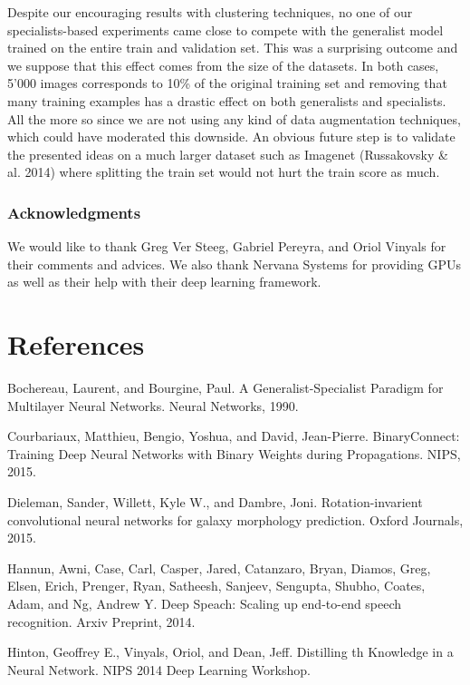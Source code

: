 \documentclass[12pt]{article}
\begin{document}
Despite our encouraging results with clustering techniques, no one of
our specialists-based experiments came close to compete with the
generalist model trained on the entire train and validation set. This
was a surprising outcome and we suppose that this effect comes from the
size of the datasets. In both cases, 5'000 images corresponds to 10\% of
the original training set and removing that many training examples has a
drastic effect on both generalists and specialists. All the more so
since we are not using any kind of data augmentation techniques, which
could have moderated this downside. An obvious future step is to
validate the presented ideas on a much larger dataset such as Imagenet
(Russakovsky \& al. 2014) where splitting the train set would not hurt
the train score as much.

\subsubsection{Acknowledgments}\label{acknowledgments}

We would like to thank Greg Ver Steeg, Gabriel Pereyra, and Oriol
Vinyals for their comments and advices. We also thank Nervana Systems
for providing GPUs as well as their help with their deep learning
framework.

\section{References}\label{references}

Bochereau, Laurent, and Bourgine, Paul. A Generalist-Specialist Paradigm
for Multilayer Neural Networks. Neural Networks, 1990.

Courbariaux, Matthieu, Bengio, Yoshua, and David, Jean-Pierre.
BinaryConnect: Training Deep Neural Networks with Binary Weights during
Propagations. NIPS, 2015.

Dieleman, Sander, Willett, Kyle W., and Dambre, Joni. Rotation-invarient
convolutional neural networks for galaxy morphology prediction. Oxford
Journals, 2015.

Hannun, Awni, Case, Carl, Casper, Jared, Catanzaro, Bryan, Diamos, Greg,
Elsen, Erich, Prenger, Ryan, Satheesh, Sanjeev, Sengupta, Shubho,
Coates, Adam, and Ng, Andrew Y. Deep Speach: Scaling up end-to-end
speech recognition. Arxiv Preprint, 2014.

Hinton, Geoffrey E., Vinyals, Oriol, and Dean, Jeff. Distilling th
Knowledge in a Neural Network. NIPS 2014 Deep Learning Workshop.
\end{document}
